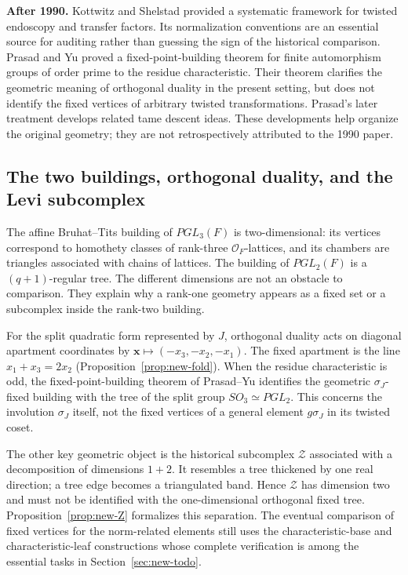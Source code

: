 \documentclass[12pt,letterpaper]{amsart}
\numberwithin{equation}{section}
\theoremstyle{definition}
\theoremstyle{plain}
\begin{document}
\textbf{After 1990.} Kottwitz and Shelstad \cite{KS99} provided a
systematic framework for twisted endoscopy and transfer factors.
Its normalization conventions are an essential source for auditing
rather than guessing the sign of the historical comparison.
Prasad and Yu \cite[Theorem~1.9]{PY02} proved a fixed-point-building
theorem for finite automorphism groups of order prime to the residue
characteristic. Their theorem clarifies the geometric meaning of
orthogonal duality in the present setting, but does not identify the
fixed vertices of arbitrary twisted transformations. Prasad's
later treatment \cite{Pr18} develops related tame descent ideas.
These developments help organize the original geometry; they are not
retrospectively attributed to the 1990 paper.

\subsection{The two buildings, orthogonal duality, and the Levi subcomplex}
\label{sec:intro-geometry}

The affine Bruhat--Tits building of $PGL_3(F)$ is two-dimensional:
its vertices correspond to homothety classes of rank-three
$\mathcal O_F$-lattices, and its chambers are triangles associated
with chains of lattices. The building of $PGL_2(F)$ is a
$(q+1)$-regular tree. The different dimensions are not an obstacle
to comparison. They explain why a rank-one geometry appears as a
fixed set or a subcomplex inside the rank-two building.

For the split quadratic form represented by $J$, orthogonal duality
acts on diagonal apartment coordinates by
$\boldsymbol x\mapsto(-x_3,-x_2,-x_1)$. The fixed apartment is the
line $x_1+x_3=2x_2$ (Proposition~\ref{prop:new-fold}). When the
residue characteristic is odd, the fixed-point-building theorem of
Prasad--Yu \cite[Theorem~1.9]{PY02} identifies the geometric
$\sigma_J$-fixed building with the tree of the split group
$SO_3\simeq PGL_2$. This concerns the involution $\sigma_J$ itself,
not the fixed vertices of a general element $g\sigma_J$ in its
twisted coset.

The other key geometric object is the historical subcomplex
$\mathcal Z$ associated with a decomposition of dimensions
$1+2$. It resembles a tree thickened by one real direction; a tree
edge becomes a triangulated band. Hence $\mathcal Z$ has dimension
two and must not be identified with the one-dimensional orthogonal
fixed tree. Proposition~\ref{prop:new-Z} formalizes this
separation. The eventual comparison of fixed vertices for the
norm-related elements still uses the characteristic-base and
characteristic-leaf constructions whose complete verification is
among the essential tasks in Section~\ref{sec:new-todo}.
\end{document}
